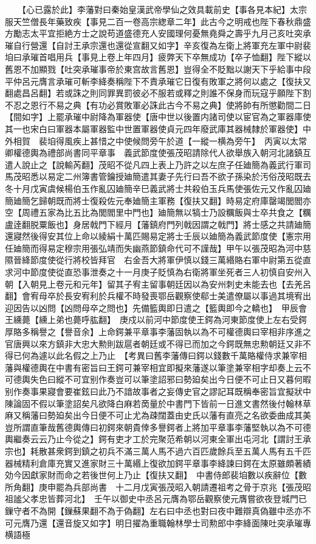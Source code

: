　　【心已露於此】李藩對曰秦始皇漢武帝學仙之效具載前史【事各見本紀】太宗服天竺僧長年藥致疾【事見二百一卷高宗緫章二年】此古今之明戒也陛下春秋鼎盛方勵志太平宜拒絶方士之說苟道盛德充人安國理何憂無堯舜之壽乎九月己亥吐突承璀自行營還【自討王承宗還也還從宣翻又如字】辛亥復為左衛上將軍充左軍中尉裴垍曰承璀首唱用兵【事見上卷上年四月】疲弊天下卒無成功【卒子恤翻】陛下縱以舊恩不加顯戮【吐突承璀事帝於東宫故言舊恩】豈得全不貶黜以謝天下乎給事中段平仲呂元膺言承璀可斬李絳奏稱陛下不責承璀它日復有敗軍之將何以處之【復扶又翻處昌呂翻】若或誅之則同罪異罰彼必不服若或釋之則誰不保身而玩寇乎願陛下割不忍之恩行不易之典【有功必賞敗軍必誅此古今不易之典】使將帥有所懲勸間二日【間如字】上罷承璀中尉降為軍器使【唐中世以後置内諸司使以宦官為之軍器庫使其一也宋白曰軍器本屬軍器監中世置軍器使貞元四年廢武庫其器械隸於軍器使】中外相賀　裴垍得風疾上甚惜之中使候問旁午於道【一縱一横為旁午】　丙寅以太常卿權德輿為禮部尚書同平章事　義武節度使張茂昭請除代人欲舉族入朝河北諸鎮互遣人說止之【說輸芮翻】茂昭不從凡四上表上乃許之以左庶子任廸簡為義武行軍司馬茂昭悉以易定二州簿書管鑰授廸簡遣其妻子先行曰吾不欲子孫染於汚俗茂昭既去冬十月戊寅虞候楊伯玉作亂囚廸簡辛巳義武將士共殺伯玉兵馬使張佐元又作亂囚廸簡廸簡乞歸朝既而將士復殺佐元奉廸簡主軍務【復扶又翻】時易定府庫罄竭閭閻亦空【周禮五家為比五比為閭閻里中門也】廸簡無以犒士乃設糲飯與士卒共食之【糲盧逹翻脱粟飯也】身居戟門下經月【藩鎮府門列戟因謂之戟門】將士感之共請廸簡還寢然後得安其位上命以綾絹十萬匹賜易定將士壬辰以廸簡為義武節度使【憲宗用任廸簡而得易定穆宗用張弘靖而失幽燕節鎮命代可不謹哉】甲午以張茂昭為河中慈隰晉絳節度使從行將校皆拜官　右金吾大將軍伊慎以錢三萬緡賂右軍中尉第五從直求河中節度使從直恐事泄奏之十一月庚子貶慎為右衛將軍坐死者三人初慎自安州入朝【入朝見上卷元和元年】留其子宥主留事朝廷因以為安州刺史未能去也【去羌呂翻】會宥母卒於長安宥利於兵權不時發喪鄂岳觀察使郗士美遣僚屬以事過其境宥出迎因告以凶問【凶問母卒之問也】先備籃輿即日遣之【籃輿即今之轎也】　甲辰會王纁薨【纁上弟也薨呼肱翻】　庚戍以前河中節度使王鍔為河東節度使上左右受鍔厚賂多稱譽之【譽音余】上命鍔兼平章事李藩固執以為不可權德輿曰宰相非序進之官唐興以來方鎮非大忠大勲則跋扈者朝廷或不得已而加之今鍔既無忠勲朝廷又非不得已何為遽以此名假之上乃止　【考異曰舊李藩傳曰鍔以錢數千萬賂權侍求兼宰相藩與權德輿在中書有密旨曰王鍔可兼宰相宜即擬來藩遂以筆塗兼宰相字却奏上云不可德輿失色曰縱不可宜别作奏豈可以筆塗詔邪曰勢廹矣出今日便不可止日又暮何暇别作奏事果寢會要崔鉉曰此乃不諳故事者之妄傳史官之謬記耳既稱奉密旨宜擬狀中陳論固不假以筆塗詔矣凡欲降白麻若啇量於中書門下皆前一日進文書然後付翰林草麻又稱藩曰勢廹矣出今日便不可止尤為疎闊蓋由史氏以藩有直亮之名欲委曲成其美豈所謂直筆哉舊德輿傳曰初鍔來朝貴倖多譽鍔者上將加平章事李藩堅執以為不可德輿繼奏云云乃止今從之】鍔有吏才工於完聚范希朝以河東全軍出屯河北【謂討王承宗也】耗散甚衆鍔到鎮之初兵不滿三萬人馬不過六百匹歲餘兵至五萬人馬有五千匹器械精利倉庫充實又進家財三十萬緡上復欲加鍔平章事李絳諫曰鍔在太原雖頗著績効今因獻家財而命之若後世何上乃止【復扶又翻】　中書侍郎裴垍數以疾辭位【數所角翻】庚申罷為兵部尚書　十二月戊寅張茂昭入朝請遷祖考之骨于京兆【張茂昭祖謐父孝忠皆葬河北】　壬午以御史中丞呂元膺為鄂岳觀察使元膺嘗欲夜登城門已鏁守者不為開【鏁蘇果翻不為于偽翻】左右曰中丞也對曰夜中難辯真偽雖中丞亦不可元膺乃還【還音旋又如字】明日擢為重職翰林學士司勲郎中李絳面陳吐突承璀專横語極

